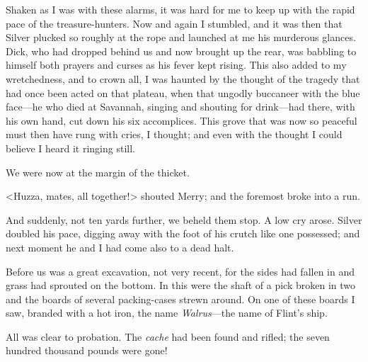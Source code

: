 Shaken as I was with these alarms, it was hard for me to keep up with the rapid pace of the treasure-hunters. Now and again I stumbled, and it was then that Silver plucked so roughly at the rope and launched at me his murderous glances. Dick, who had dropped behind us and now brought up the rear, was babbling to himself both prayers and curses as his fever kept rising. This also added to my wretchedness, and to crown all, I was haunted by the thought of the tragedy that had once been acted on that plateau, when that ungodly buccaneer with the blue face—he who died at Savannah, singing and shouting for drink—had there, with his own hand, cut down his six accomplices. This grove that was now so peaceful must then have rung with cries, I thought; and even with the thought I could believe I heard it ringing still.

We were now at the margin of the thicket.

<Huzza, mates, all together!> shouted Merry; and the foremost broke into a run.

And suddenly, not ten yards further, we beheld them stop. A low cry arose. Silver doubled his pace, digging away with the foot of his crutch like one possessed; and next moment he and I had come also to a dead halt.

Before us was a great excavation, not very recent, for the sides had fallen in and grass had sprouted on the bottom. In this were the shaft of a pick broken in two and the boards of several packing-cases strewn around. On one of these boards I saw, branded with a hot iron, the name \textit{Walrus}—the name of Flint's ship.

All was clear to probation. The \textit{cache} had been found and rifled; the seven hundred thousand pounds were gone!